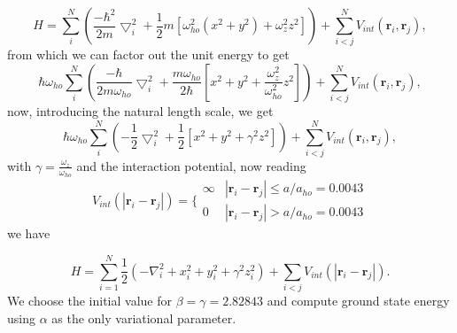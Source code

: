 \documentclass[11pt,a4paper,titlepage]{article}
\begin{document}
\begin{equation}
     H = \sum_i^N \left(\frac{-\hbar^2}{2m}{\bigtriangledown }_{i}^2 +\frac{1}{2}m[\omega_{ho}^2(x^2+y^2) + \omega_z^2z^2]\right)  +
	 \sum_{i<j}^{N} V_{int}({\mathbf{r}}_i,{\mathbf{r}}_j),
 \end{equation}
from which we can factor out the unit energy to get
\begin{equation}
\hbar\omega_{ho}\sum_i^N \left(\frac{-\hbar}{2m\omega_{ho}}{\bigtriangledown }_{i}^2 +\frac{m\omega_{ho}}{2\hbar}[x^2+y^2 + \frac{\omega_z^2}{\omega_{ho}^2}z^2]\right)  +
	 \sum_{i<j}^{N} V_{int}({\mathbf{r}}_i,{\mathbf{r}}_j),
 \end{equation}
now, introducing the natural length scale, we get
\begin{equation}
\hbar\omega_{ho}\sum_i^N \left(-\frac{1}{2}{\bigtriangledown }_{i}^2 +\frac{1}{2}[x^2+y^2 + \gamma^2z^2]\right)  +
	 \sum_{i<j}^{N} V_{int}({\mathbf{r}}_i,{\mathbf{r}}_j),
 \end{equation}
with $\gamma = \frac{\omega_z}{\omega_{ho}} $ and the interaction potential, now reading
\begin{equation}
 V_{int}(|\mathbf{r}_i-\mathbf{r}_j|) =  \Bigg\{
 \begin{array}{ll}
	 \infty & {|\mathbf{r}_i-\mathbf{r}_j|} \leq {a/a_{ho}=0.0043}\\
	 0 & {|\mathbf{r}_i-\mathbf{r}_j|} > {a/a_{ho}=0.0043}
 \end{array}
\end{equation}
we have

\begin{equation*} 
    H=\sum_{i=1}^N\frac{1}{2}\left(-\nabla^2_i+x_i^2+y_i^2+\gamma^2z_i^2\right)+\sum_{i<j}V_{int}(|\mathbf{r}_i-\mathbf{r}_j|).
 \end{equation*}
We choose the initial value for
 $\beta=\gamma = 2.82843$ and compute 
 ground state energy using $\alpha$ as the only variational parameter.
\end{document}
